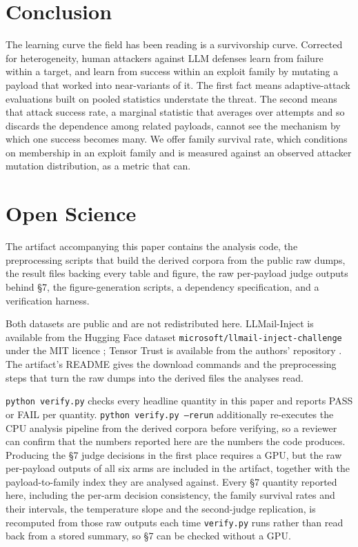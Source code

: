 \documentclass[conference]{IEEEtran}
\begin{document}
\section{Conclusion}

The learning curve the field has been reading is a survivorship curve. Corrected for heterogeneity, human attackers against LLM defenses learn from failure within a target, and learn from success within an exploit family by mutating a payload that worked into near-variants of it. The first fact means adaptive-attack evaluations built on pooled statistics understate the threat. The second means that attack success rate, a marginal statistic that averages over attempts and so discards the dependence among related payloads, cannot see the mechanism by which one success becomes many. We offer family survival rate, which conditions on membership in an exploit family and is measured against an observed attacker mutation distribution, as a metric that can.


\section{Open Science}

The artifact accompanying this paper contains the analysis code, the preprocessing scripts that build the derived corpora from the public raw dumps, the result files backing every table and figure, the raw per-payload judge outputs behind \S7, the figure-generation scripts, a dependency specification, and a verification harness.

Both datasets are public and are not redistributed here. LLMail-Inject is available from the Hugging Face dataset \texttt{microsoft/llmail-inject-challenge} under the MIT licence \cite{llmail}; Tensor Trust is available from the authors' repository \cite{tensortrust}. The artifact's README gives the download commands and the preprocessing steps that turn the raw dumps into the derived files the analyses read.

\texttt{python verify.py} checks every headline quantity in this paper and reports PASS or FAIL per quantity. \texttt{python verify.py --rerun} additionally re-executes the CPU analysis pipeline from the derived corpora before verifying, so a reviewer can confirm that the numbers reported here are the numbers the code produces. Producing the \S7 judge decisions in the first place requires a GPU, but the raw per-payload outputs of all six arms are included in the artifact, together with the payload-to-family index they are analysed against. Every \S7 quantity reported here, including the per-arm decision consistency, the family survival rates and their intervals, the temperature slope and the second-judge replication, is recomputed from those raw outputs each time \texttt{verify.py} runs rather than read back from a stored summary, so \S7 can be checked without a GPU.
\end{document}
